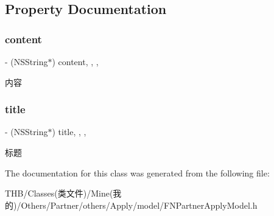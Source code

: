 \subsection{Property Documentation}
\mbox{\label{interface_f_a_mintroduce_aeb82aa911e11969037993aea90c4de46}} 
\subsubsection{\texorpdfstring{content}{content}}
{\footnotesize\ttfamily -\/ (N\+S\+String$\ast$) content\hspace{0.3cm}{\ttfamily [read]}, {\ttfamily [write]}, {\ttfamily [nonatomic]}, {\ttfamily [copy]}}

内容 \mbox{\label{interface_f_a_mintroduce_a06d163b570725a1485a7b768b24f72e0}} 
\subsubsection{\texorpdfstring{title}{title}}
{\footnotesize\ttfamily -\/ (N\+S\+String$\ast$) title\hspace{0.3cm}{\ttfamily [read]}, {\ttfamily [write]}, {\ttfamily [nonatomic]}, {\ttfamily [copy]}}

标题 

The documentation for this class was generated from the following file\+:\begin{DoxyCompactItemize}
\item 
T\+H\+B/\+Classes(类文件)/\+Mine(我的)/\+Others/\+Partner/others/\+Apply/model/F\+N\+Partner\+Apply\+Model.\+h\end{DoxyCompactItemize}
